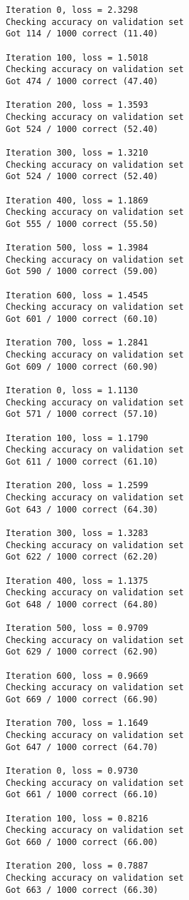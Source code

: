 \documentclass[11pt]{article}
\begin{document}
    \begin{Verbatim}[commandchars=\\\{\}]
Iteration 0, loss = 2.3298
Checking accuracy on validation set
Got 114 / 1000 correct (11.40)

Iteration 100, loss = 1.5018
Checking accuracy on validation set
Got 474 / 1000 correct (47.40)

Iteration 200, loss = 1.3593
Checking accuracy on validation set
Got 524 / 1000 correct (52.40)

Iteration 300, loss = 1.3210
Checking accuracy on validation set
Got 524 / 1000 correct (52.40)

Iteration 400, loss = 1.1869
Checking accuracy on validation set
Got 555 / 1000 correct (55.50)

Iteration 500, loss = 1.3984
Checking accuracy on validation set
Got 590 / 1000 correct (59.00)

Iteration 600, loss = 1.4545
Checking accuracy on validation set
Got 601 / 1000 correct (60.10)

Iteration 700, loss = 1.2841
Checking accuracy on validation set
Got 609 / 1000 correct (60.90)

Iteration 0, loss = 1.1130
Checking accuracy on validation set
Got 571 / 1000 correct (57.10)

Iteration 100, loss = 1.1790
Checking accuracy on validation set
Got 611 / 1000 correct (61.10)

Iteration 200, loss = 1.2599
Checking accuracy on validation set
Got 643 / 1000 correct (64.30)

Iteration 300, loss = 1.3283
Checking accuracy on validation set
Got 622 / 1000 correct (62.20)

Iteration 400, loss = 1.1375
Checking accuracy on validation set
Got 648 / 1000 correct (64.80)

Iteration 500, loss = 0.9709
Checking accuracy on validation set
Got 629 / 1000 correct (62.90)

Iteration 600, loss = 0.9669
Checking accuracy on validation set
Got 669 / 1000 correct (66.90)

Iteration 700, loss = 1.1649
Checking accuracy on validation set
Got 647 / 1000 correct (64.70)

Iteration 0, loss = 0.9730
Checking accuracy on validation set
Got 661 / 1000 correct (66.10)

Iteration 100, loss = 0.8216
Checking accuracy on validation set
Got 660 / 1000 correct (66.00)

Iteration 200, loss = 0.7887
Checking accuracy on validation set
Got 663 / 1000 correct (66.30)


\end{Verbatim}
\end{document}
